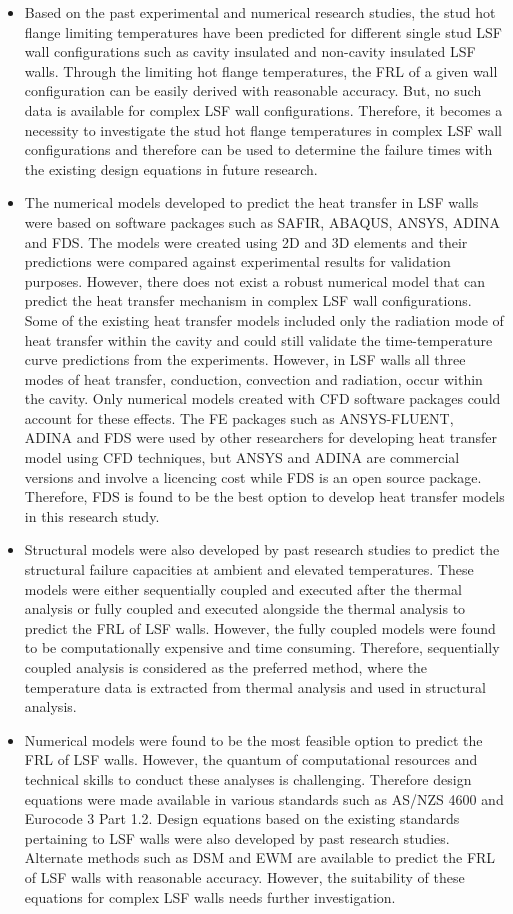\begin{itemize}
	\item Based on the past experimental and numerical research studies, the stud hot flange limiting temperatures have been predicted for different single stud LSF wall configurations such as cavity insulated and non-cavity insulated LSF walls. Through the limiting hot flange temperatures, the FRL of a given wall configuration can be easily derived with reasonable accuracy. But, no such data is available for complex LSF wall configurations. Therefore, it becomes a necessity to investigate the stud hot flange temperatures in complex LSF wall configurations and therefore can be used to determine the failure times with the existing design equations in future research. 
	\item The numerical models developed to predict the heat transfer in LSF walls were based on software packages such as SAFIR, ABAQUS, ANSYS, ADINA and FDS. The models were created using 2D and 3D elements and their predictions were compared against experimental results for validation purposes. However, there does not exist a robust numerical model that can predict the heat transfer mechanism in complex LSF wall configurations. Some of the existing heat transfer models included only the radiation mode of heat transfer within the cavity and could still validate the time-temperature curve predictions from the experiments. However, in LSF walls all three modes of heat transfer, conduction, convection and radiation, occur within the cavity. Only numerical models created with CFD software packages could account for these effects. The FE packages such as ANSYS-FLUENT, ADINA and FDS were used by other researchers for developing heat transfer model using CFD techniques, but ANSYS and ADINA are commercial versions and involve a licencing cost while FDS is an open source package. Therefore, FDS is found to be the best option to develop heat transfer models in this research study.
	\item Structural models were also developed by past research studies to predict the structural failure capacities at ambient and elevated temperatures. These models were either sequentially coupled and executed after the thermal analysis or fully coupled and executed alongside the thermal analysis to predict the FRL of LSF walls. However, the fully coupled models were found to be computationally expensive and time consuming. Therefore, sequentially coupled analysis is considered as the preferred method, where the temperature data is extracted from thermal analysis and used in structural analysis.
	\item Numerical models were found to be the most feasible option to predict the FRL of LSF walls. However, the quantum of computational resources and technical skills to conduct these analyses is challenging. Therefore design equations were made available in various standards such as AS/NZS 4600 and Eurocode 3 Part 1.2. Design equations based on the existing standards pertaining to LSF walls were also developed by past research studies. Alternate methods such as DSM and EWM are available to predict the FRL of LSF walls with reasonable accuracy. However, the suitability of these equations for complex LSF walls needs further investigation.

\end{itemize}
